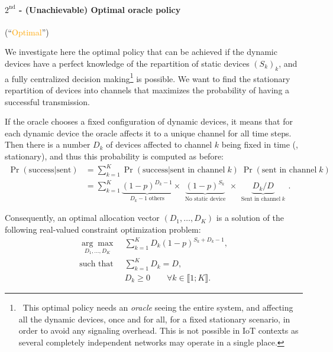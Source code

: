 \paragraph{$2^{\text{nd}}$ - (Unachievable) Optimal oracle policy} (``\textcolor{orange}{Optimal}'')

We investigate here the optimal policy that can be achieved if the dynamic devices have a perfect knowledge of the repartition of static devices $(S_k)_k$, and a fully centralized decision making\footnote{~This optimal policy needs an \emph{oracle} seeing the entire system, and affecting all the dynamic devices, once and for all, for a fixed stationary scenario, in order to avoid any signaling overhead. This is not possible in IoT contexts as several completely independent networks may operate in a single place.} is possible.
We want to find the stationary repartition of devices into channels that maximizes the probability of having a successful transmission.

If the oracle chooses a fixed configuration of dynamic devices, it means that for each dynamic device the oracle affects it to a unique channel for all time steps.
Then there is a number $D_k$ of devices affected to channel $k$ being fixed in time (\ie, stationary),
and thus this probability is computed as before:
%
\begin{align}\label{eq:41:prob_col}
    \Pr(\text{success}|\text{sent})
    & = \sum_{k=1}^{K} \Pr(\text{success}|\text{sent in channel}\;k) \; \Pr(\text{sent in channel}\;k) \nonumber \\
    & = \sum_{k=1}^{K} \underbrace{(1 - p)^{D_k - 1}}_{\;\;D_k - 1 \;\text{others}\;\;} \times \underbrace{(1 - p)^{S_k}}_{\;\;\text{No static device}\;\;} \times \underbrace{ D_k / D }_{\;\;\text{Sent in channel}\; k\;\;}.
\end{align}

Consequently, an optimal allocation vector $(D_1,\dots,D_{K})$ is a solution of the following real-valued constraint optimization problem:
%
\begin{subequations}\label{eq:41:prob}
\begin{align}
    \underset{D_1,\dots,D_{K}}{\arg\max}\; & \sum_{k=1}^{K} D_k (1 - p)^{S_k + D_k -1}, \label{eq:41:optPb}\\
    \text{such that}\;\; & \sum_{k=1}^{K} D_k = D, \label{eq:41:eqCstr}\\
    & D_k \geq 0 \qquad \forall k\in\llbracket 1;K\rrbracket . \label{eq:41:ineqCstr}
\end{align}
\end{subequations}


